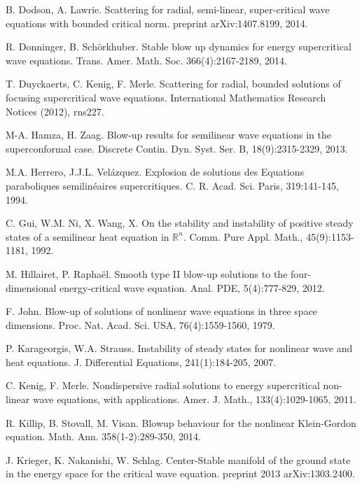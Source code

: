 \documentclass[11pt,a4paper,reqno]{amsart}
\theoremstyle{remark}
\numberwithin{equation}{section}
\begin{document}
 \frenchspacing

\begin{thebibliography}{99}

 
 
 B. Dodson, A. Lawrie. Scattering for radial, semi-linear, super-critical wave equations with bounded critical norm. preprint arXiv:1407.8199, 2014.
 
 R. Donninger, B. Sch\"orkhuber. Stable blow up dynamics for energy supercritical wave equations. Trans. Amer. Math. Soc. 366(4):2167-2189, 2014.

 T. Duyckaerts, C. Kenig, F. Merle. Scattering for radial, bounded solutions of focusing supercritical wave equations. International Mathematics Research Notices (2012), rns227.

  M-A. Hamza, H. Zaag. Blow-up results for semilinear wave equations in the superconformal case. Discrete Contin. Dyn. Syst. Ser. B, 18(9):2315-2329, 2013.
 
 M.A. Herrero, J.J.L. Vel\'azquez. Explosion de solutions des Equations paraboliques semilin\'eaires supercritiques. C. R. Acad. Sci. Paris, 319:141-145, 1994.

 C. Gui, W.M. Ni, X. Wang, X. On the stability and instability of positive steady states of a semilinear heat equation in $\mathbb{R}^n$. Comm. Pure Appl. Math., 45(9):1153-1181, 1992.

 M. Hillairet, P. Rapha\"el.  Smooth type II blow-up solutions to the four-dimensional energy-critical wave equation. Anal. PDE, 5(4):777-829, 2012.

 F. John. Blow-up of solutions of nonlinear wave equations in three space dimensions. Proc. Nat. Acad. Sci. USA, 76(4):1559-1560, 1979.

  P. Karageorgis, W.A. Strauss. Instability of steady states for nonlinear wave and heat equations. J. Differential Equations, 241(1):184-205, 2007.

 C. Kenig, F. Merle. Nondispersive radial solutions to energy supercritical non-linear wave equations, with applications. Amer. J. Math., 133(4):1029-1065, 2011.

 R. Killip, B. Stovall, M. Visan. Blowup behaviour for the nonlinear Klein-Gordon equation. Math. Ann. 358(1-2):289-350, 2014.

 J. Krieger, K. Nakanishi, W. Schlag. Center-Stable manifold of the ground state in the energy space for the critical wave equation. preprint 2013 arXiv:1303.2400.


\end{thebibliography}
\end{document}
